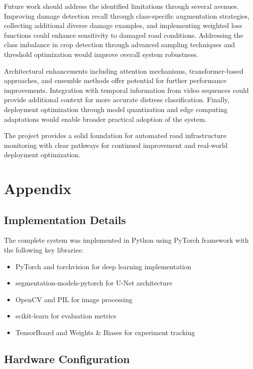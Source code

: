 \documentclass[12pt,twocolumn]{article}
\begin{document}
Future work should address the identified limitations through several avenues. Improving damage detection recall through class-specific augmentation strategies, collecting additional diverse damage examples, and implementing weighted loss functions could enhance sensitivity to damaged road conditions. Addressing the class imbalance in crop detection through advanced sampling techniques and threshold optimization would improve overall system robustness.

Architectural enhancements including attention mechanisms, transformer-based approaches, and ensemble methods offer potential for further performance improvements. Integration with temporal information from video sequences could provide additional context for more accurate distress classification. Finally, deployment optimization through model quantization and edge computing adaptations would enable broader practical adoption of the system.

The project provides a solid foundation for automated road infrastructure monitoring with clear pathways for continued improvement and real-world deployment optimization.

\clearpage

\onecolumn



\twocolumn
\section{Appendix}

\subsection{Implementation Details}

The complete system was implemented in Python using PyTorch framework with the following key libraries:
\begin{itemize}
\item PyTorch and torchvision for deep learning implementation
\item segmentation-models-pytorch for U-Net architecture
\item OpenCV and PIL for image processing
\item scikit-learn for evaluation metrics
\item TensorBoard and Weights \& Biases for experiment tracking
\end{itemize}

\subsection{Hardware Configuration}
\end{document}
